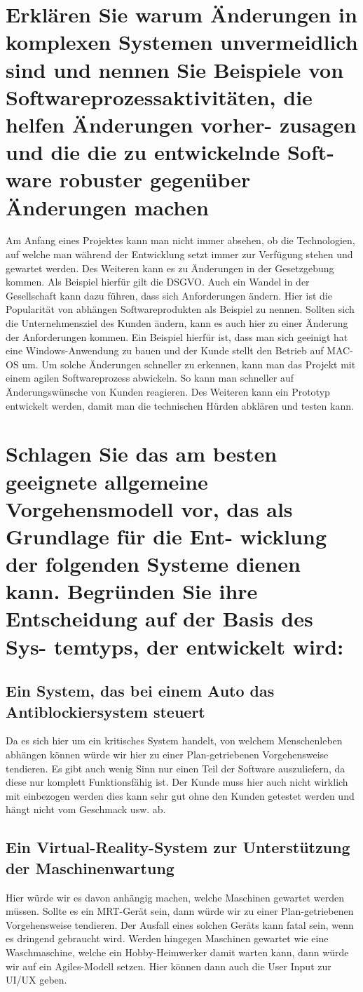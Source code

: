 \documentclass[12pt]{article}
\begin{document}
\section{Erklären Sie warum Änderungen in komplexen Systemen unvermeidlich sind und nennen Sie Beispiele
von Softwareprozessaktivitäten, die helfen Änderungen vorher- zusagen und die die zu entwickelnde Soft-
ware robuster gegenüber Änderungen machen}
Am Anfang eines Projektes kann man nicht immer absehen, ob die Technologien, auf welche man während der Entwicklung setzt immer zur Verfügung stehen und gewartet werden. Des Weiteren kann es zu Änderungen in der Gesetzgebung kommen. Als Beispiel hierfür gilt die DSGVO. Auch ein Wandel in der Gesellschaft kann dazu führen, dass sich Anforderungen ändern. Hier ist die Popularität von abhängen Softwareprodukten als Beispiel zu nennen. Sollten sich die Unternehmensziel des Kunden ändern, kann es auch hier zu einer Änderung der Anforderungen kommen. Ein Beispiel hierfür ist, dass man sich geeinigt hat eine Windows-Anwendung zu bauen und der Kunde stellt den Betrieb auf MAC-OS um.
Um solche Änderungen schneller zu erkennen, kann man das Projekt mit einem agilen Softwareprozess abwickeln. So kann man schneller auf Änderungswünsche von Kunden reagieren. Des Weiteren kann ein Prototyp entwickelt werden, damit man die technischen Hürden abklären und testen kann.
\section{Schlagen Sie das am besten geeignete allgemeine Vorgehensmodell vor, das als Grundlage für die Ent-
wicklung der folgenden Systeme dienen kann. Begründen Sie ihre Entscheidung auf der Basis des Sys-
temtyps, der entwickelt wird:}
\subsection{Ein System, das bei einem Auto das Antiblockiersystem steuert}
Da es sich hier um ein kritisches System handelt, von welchem Menschenleben abhängen können würde wir hier zu einer Plan-getriebenen Vorgehensweise tendieren.
Es gibt auch wenig Sinn nur einen Teil der Software auszuliefern, da diese nur komplett Funktionsfähig ist. Der Kunde muss hier auch nicht wirklich mit einbezogen werden dies kann sehr gut ohne den Kunden getestet werden und hängt nicht vom Geschmack usw. ab.
\subsection{Ein Virtual-Reality-System zur Unterstützung der Maschinenwartung}
Hier würde wir es davon anhängig machen, welche Maschinen gewartet werden müssen. Sollte es ein MRT-Gerät sein, dann würde wir zu einer Plan-getriebenen Vorgehensweise tendieren.
Der Ausfall eines solchen Geräts kann fatal sein, wenn es dringend gebraucht wird. Werden hingegen Maschinen gewartet wie eine Waschmaschine, welche ein Hobby-Heimwerker damit warten kann, dann würde wir auf ein Agiles-Modell setzen. Hier können dann auch die User Input zur UI/UX geben.
\end{document}
